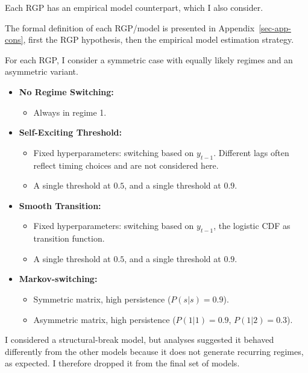 \documentclass[
  letterpaper,
  DIV=11,
  numbers=noendperiod]{scrartcl}
\providecommand{\tightlist}{%
  \setlength{\itemsep}{0pt}\setlength{\parskip}{0pt}}\usepackage{longtable,booktabs,array}
\numberwithin{equation}{section}
\numberwithin{table}{section}
\numberwithin{figure}{section}
\begin{document}
Each RGP has an empirical model counterpart, which I also consider.

The formal definition of each RGP/model is presented in
Appendix~\ref{sec-app-cons}, first the RGP hypothesis, then the
empirical model estimation strategy.

For each RGP, I consider a symmetric case with equally likely regimes
and an asymmetric variant.

\begin{itemize}
\tightlist
\item
  \textbf{No Regime Switching:}

  \begin{itemize}
  \tightlist
  \item
    Always in regime 1.
  \end{itemize}
\item
  \textbf{Self-Exciting Threshold:}

  \begin{itemize}
  \tightlist
  \item
    Fixed hyperparameters: switching based on \(y_{t-1}\). Different
    lags often reflect timing choices and are not considered here.
  \item
    A single threshold at \(0.5\), and a single threshold at \(0.9\).
  \end{itemize}
\item
  \textbf{Smooth Transition:}

  \begin{itemize}
  \tightlist
  \item
    Fixed hyperparameters: switching based on \(y_{t-1}\), the logistic
    CDF as transition function.
  \item
    A single threshold at \(0.5\), and a single threshold at \(0.9\).
  \end{itemize}
\item
  \textbf{Markov-switching:}

  \begin{itemize}
  \tightlist
  \item
    Symmetric matrix, high persistence (\(P(s | s) = 0.9\)).
  \item
    Asymmetric matrix, high persistence (\(P(1 | 1) = 0.9\),
    \(P(1 | 2) = 0.3\)).
  \end{itemize}
\end{itemize}

I considered a structural-break model, but analyses suggested it behaved
differently from the other models because it does not generate recurring
regimes, as expected. I therefore dropped it from the final set of
models.
\end{document}
